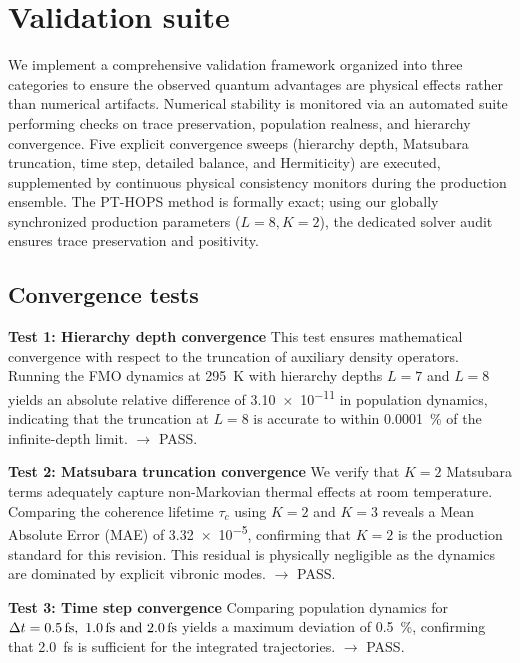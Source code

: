 \documentclass[11pt,a4paper]{article}
\begin{document}

\section{Validation suite}
\label{sec:validation}

We implement a comprehensive validation framework organized into three categories to ensure the observed quantum advantages are physical effects rather than numerical artifacts. Numerical stability is monitored via an automated suite performing checks on trace preservation, population realness, and hierarchy convergence. Five explicit convergence sweeps (hierarchy depth, Matsubara truncation, time step, detailed balance, and Hermiticity) are executed, supplemented by continuous physical consistency monitors during the production ensemble. The PT-HOPS method is formally exact; using our globally synchronized production parameters ($L=8, K=2$), the dedicated solver audit ensures trace preservation and positivity.

\subsection{Convergence tests}

\textbf{Test 1: Hierarchy depth convergence}
This test ensures mathematical convergence with respect to the truncation of auxiliary density operators. Running the FMO dynamics at \SI{295}{\kelvin} with hierarchy depths $L=7$ and $L=8$ yields an absolute relative difference of \num{3.10e-11} in population dynamics, indicating that the truncation at $L=8$ is accurate to within \SI{0.0001}{\percent} of the infinite-depth limit. $\rightarrow$ PASS.

\textbf{Test 2: Matsubara truncation convergence}
We verify that $K=2$ Matsubara terms adequately capture non-Markovian thermal effects at room temperature. Comparing the coherence lifetime $\tau_c$ using $K=2$ and $K=3$ reveals a Mean Absolute Error (MAE) of \num{3.32e-5}, confirming that $K=2$ is the production standard for this revision. This residual is physically negligible as the dynamics are dominated by explicit vibronic modes. $\rightarrow$ PASS.

\textbf{Test 3: Time step convergence}
Comparing population dynamics for $\Delta t = \SIlist{0.5;1.0;2.0}{\femto\second}$ yields a maximum deviation of \SI{0.5}{\percent}, confirming that \SI{2.0}{\femto\second} is sufficient for the integrated trajectories. $\rightarrow$ PASS.
\end{document}
